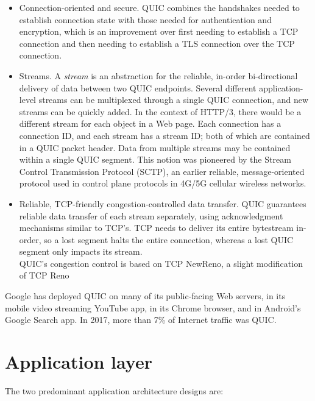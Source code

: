 \documentclass[table, xcdraw]{article}%
\begin{document}
\begin{itemize}
    \item Connection-oriented and secure. QUIC combines the handshakes needed to establish connection state with those needed for authentication and encryption, which is an improvement over first needing to establish a TCP connection and then needing to establish a TLS connection over the TCP connection.
    \item Streams. A \emph{stream} is an abstraction for the reliable, in-order bi-directional delivery of data between two QUIC endpoints. Several different application-level streams can be multiplexed through a single QUIC connection, and new streams can be quickly added. In the context of HTTP/3, there would be a different stream for each object in a Web page. Each connection has a connection ID, and each stream has a stream ID; both of which are contained in a QUIC packet header. Data from multiple streams may be contained within a single QUIC segment. This notion was pioneered by the Stream Control Transmission Protocol (SCTP), an earlier reliable, message-oriented protocol used in control plane protocols in 4G/5G cellular wireless networks.
    \item Reliable, TCP-friendly congestion-controlled data transfer. QUIC guarantees reliable data transfer of each stream separately, using acknowledgment mechanisms similar to TCP’s. TCP needs to deliver its entire bytestream in-order, so a lost segment halts the entire connection, whereas a lost QUIC segment only impacts its stream.\\
    QUIC’s congestion control is based on TCP NewReno, a slight modification of TCP Reno
\end{itemize}

Google has deployed QUIC on many of its public-facing Web servers, in its mobile video streaming YouTube app, in its Chrome browser, and in Android’s Google Search app. In 2017, more than 7\% of Internet traffic was QUIC.

\section{Application layer} \label{ch:application}

The two predominant application architecture designs are:
\end{document}
